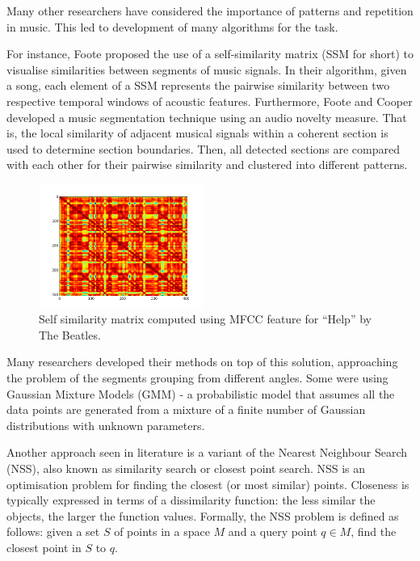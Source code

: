 Many other researchers have considered the importance of patterns and repetition in music. This led to development of many algorithms for the task.

For instance, Foote \cite{Foote} proposed the use of a self-similarity matrix (SSM for short) to visualise similarities between segments of music signals. In their algorithm, given a song, each element of a SSM represents the pairwise similarity between two respective temporal windows of acoustic features. Furthermore, Foote and Cooper \cite{FooteCooper} developed a music segmentation technique using an audio novelty measure. That is, the local similarity of adjacent musical signals within a coherent section is used to determine section boundaries. Then, all detected sections are compared with each other for their pairwise similarity and clustered into different patterns.

\begin{figure}
  \begin{center}
    \includegraphics[width=0.48\textwidth]{Figures/mfcc_no_log_sync}
  \end{center}
  \caption{Self similarity matrix computed using MFCC feature for ``Help'' by The Beatles.}
  \label{fig:SSMbach}
\end{figure}


Many researchers developed their methods on top of this solution, approaching the problem of the segments grouping from different angles. Some were using Gaussian Mixture Models (GMM) - a probabilistic model that assumes all the data points are generated from a mixture of a finite number of Gaussian distributions with unknown parameters. 

Another approach seen in literature is a variant of the Nearest Neighbour Search (NSS), also known as similarity search or closest point search. NSS is an optimisation problem for finding the closest (or most similar) points. Closeness is typically expressed in terms of a dissimilarity function: the less similar the objects, the larger the function values. Formally, the NSS problem is defined as follows: given a set $S$ of points in a space $M$ and a query point $q \in M$, find the closest point in $S$ to $q$.

